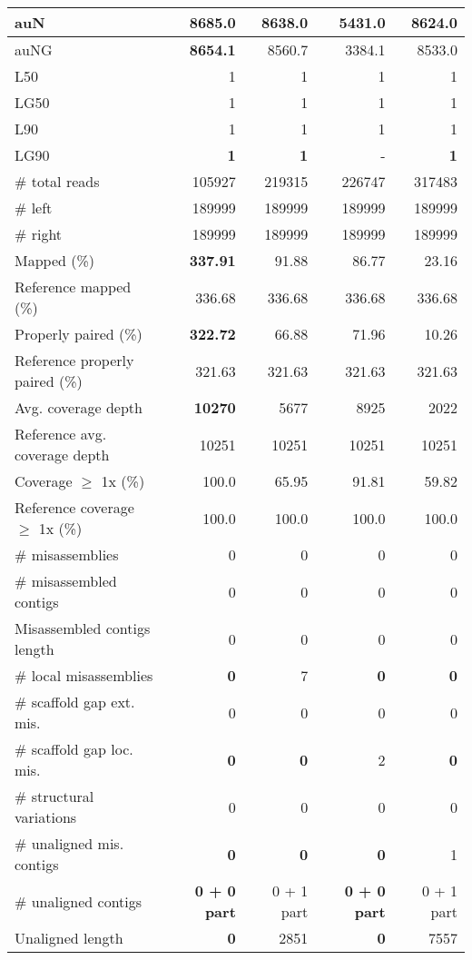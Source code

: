 \documentclass[12pt,a4paper]{article}
\begin{document}
\begin{table}[ht]
\begin{center}
\begin{tabular}{|l*{4}{|r}|}
auN & {\bf 8685.0} & 8638.0 & 5431.0 & 8624.0 \\ \hline
auNG & {\bf 8654.1} & 8560.7 & 3384.1 & 8533.0 \\ \hline
L50 & 1 & 1 & 1 & 1 \\ \hline
LG50 & 1 & 1 & 1 & 1 \\ \hline
L90 & 1 & 1 & 1 & 1 \\ \hline
LG90 & {\bf 1} & {\bf 1} & - & {\bf 1} \\ \hline
\# total reads & 105927 & 219315 & 226747 & 317483 \\ \hline
\# left & 189999 & 189999 & 189999 & 189999 \\ \hline
\# right & 189999 & 189999 & 189999 & 189999 \\ \hline
Mapped (\%) & {\bf 337.91} & 91.88 & 86.77 & 23.16 \\ \hline
Reference mapped (\%) & 336.68 & 336.68 & 336.68 & 336.68 \\ \hline
Properly paired (\%) & {\bf 322.72} & 66.88 & 71.96 & 10.26 \\ \hline
Reference properly paired (\%) & 321.63 & 321.63 & 321.63 & 321.63 \\ \hline
Avg. coverage depth & {\bf 10270} & 5677 & 8925 & 2022 \\ \hline
Reference avg. coverage depth & 10251 & 10251 & 10251 & 10251 \\ \hline
Coverage $\geq$ 1x (\%) & 100.0 & 65.95 & 91.81 & 59.82 \\ \hline
Reference coverage $\geq$ 1x (\%) & 100.0 & 100.0 & 100.0 & 100.0 \\ \hline
\# misassemblies & 0 & 0 & 0 & 0 \\ \hline
\# misassembled contigs & 0 & 0 & 0 & 0 \\ \hline
Misassembled contigs length & 0 & 0 & 0 & 0 \\ \hline
\# local misassemblies & {\bf 0} & 7 & {\bf 0} & {\bf 0} \\ \hline
\# scaffold gap ext. mis. & 0 & 0 & 0 & 0 \\ \hline
\# scaffold gap loc. mis. & {\bf 0} & {\bf 0} & 2 & {\bf 0} \\ \hline
\# structural variations & 0 & 0 & 0 & 0 \\ \hline
\# unaligned mis. contigs & {\bf 0} & {\bf 0} & {\bf 0} & 1 \\ \hline
\# unaligned contigs & {\bf 0 + 0 part} & 0 + 1 part & {\bf 0 + 0 part} & 0 + 1 part \\ \hline
Unaligned length & {\bf 0} & 2851 & {\bf 0} & 7557 \\ \hline

\end{tabular}
\end{center}
\end{table}
\end{document}
